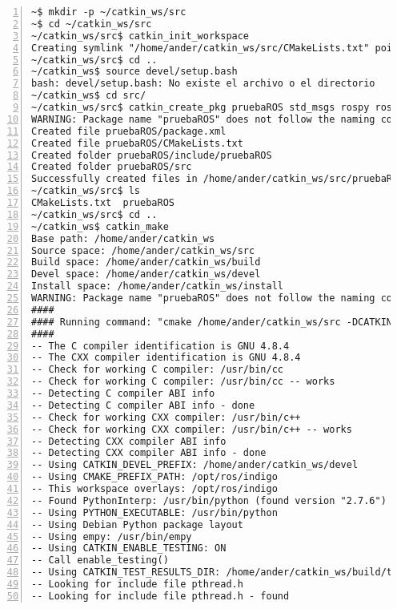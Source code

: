 	\begin{lstlisting}[style=consola,numbers=left]
~$ mkdir -p ~/catkin_ws/src
~$ cd ~/catkin_ws/src
~/catkin_ws/src$ catkin_init_workspace
Creating symlink "/home/ander/catkin_ws/src/CMakeLists.txt" pointing to "/opt/ros/indigo/share/catkin/cmake/toplevel.cmake"
~/catkin_ws/src$ cd ..
~/catkin_ws$ source devel/setup.bash
bash: devel/setup.bash: No existe el archivo o el directorio
~/catkin_ws$ cd src/
~/catkin_ws/src$ catkin_create_pkg pruebaROS std_msgs rospy roscpp
WARNING: Package name "pruebaROS" does not follow the naming conventions. It should start with a lower case letter and only contain lower case letters, digits and underscores.
Created file pruebaROS/package.xml
Created file pruebaROS/CMakeLists.txt
Created folder pruebaROS/include/pruebaROS
Created folder pruebaROS/src
Successfully created files in /home/ander/catkin_ws/src/pruebaROS. Please adjust the values in package.xml.
~/catkin_ws/src$ ls
CMakeLists.txt  pruebaROS
~/catkin_ws/src$ cd ..
~/catkin_ws$ catkin_make
Base path: /home/ander/catkin_ws
Source space: /home/ander/catkin_ws/src
Build space: /home/ander/catkin_ws/build
Devel space: /home/ander/catkin_ws/devel
Install space: /home/ander/catkin_ws/install
WARNING: Package name "pruebaROS" does not follow the naming conventions. It should start with a lower case letter and only contain lower case letters, digits and underscores.
####
#### Running command: "cmake /home/ander/catkin_ws/src -DCATKIN_DEVEL_PREFIX=/home/ander/catkin_ws/devel -DCMAKE_INSTALL_PREFIX=/home/ander/catkin_ws/install -G Unix Makefiles" in "/home/ander/catkin_ws/build"
####
-- The C compiler identification is GNU 4.8.4
-- The CXX compiler identification is GNU 4.8.4
-- Check for working C compiler: /usr/bin/cc
-- Check for working C compiler: /usr/bin/cc -- works
-- Detecting C compiler ABI info
-- Detecting C compiler ABI info - done
-- Check for working CXX compiler: /usr/bin/c++
-- Check for working CXX compiler: /usr/bin/c++ -- works
-- Detecting CXX compiler ABI info
-- Detecting CXX compiler ABI info - done
-- Using CATKIN_DEVEL_PREFIX: /home/ander/catkin_ws/devel
-- Using CMAKE_PREFIX_PATH: /opt/ros/indigo
-- This workspace overlays: /opt/ros/indigo
-- Found PythonInterp: /usr/bin/python (found version "2.7.6")
-- Using PYTHON_EXECUTABLE: /usr/bin/python
-- Using Debian Python package layout
-- Using empy: /usr/bin/empy
-- Using CATKIN_ENABLE_TESTING: ON
-- Call enable_testing()
-- Using CATKIN_TEST_RESULTS_DIR: /home/ander/catkin_ws/build/test_results
-- Looking for include file pthread.h
-- Looking for include file pthread.h - found

\end{lstlisting}

